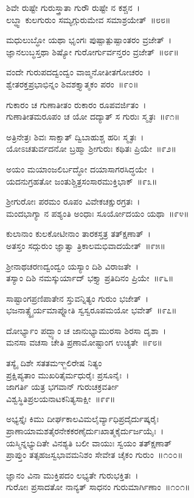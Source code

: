 ಶಿವೇ ರುಷ್ಟೇ ಗುರುಸ್ತ್ರಾತಾ ಗುರೌ ರುಷ್ಟೇ ನ ಕಶ್ಚನ~।\\
ಲಬ್ಧ್ವಾ ಕುಲಗುರುಂ ಸಮ್ಯಗ್ಗುರುಮೇವ ಸಮಾಶ್ರಯೇತ್~॥೮೮॥

ಮಧುಲುಬ್ಧೋ ಯಥಾ ಭೃಂಗಃ ಪುಷ್ಪಾತ್ಪುಷ್ಪಾಂತರಂ ವ್ರಜೇತ್~।\\
ಜ್ಞಾನಲುಬ್ಧಸ್ತಥಾ ಶಿಷ್ಯೋ ಗುರೋರ್ಗುರ್ವನ್ತರಂ ವ್ರಜೇತ್~॥೮೯॥

ವಂದೇ ಗುರುಪದದ್ವಂದ್ವಂ ವಾಙ್ಮನೋತೀತಗೋಚರಂ~।\\
ಶ್ವೇತರಕ್ತಪ್ರಭಾಭಿನ್ನಂ ಶಿವಶಕ್ತ್ಯಾತ್ಮಕಂ ಪರಂ~॥೯೦॥

ಗುಕಾರಂ ಚ ಗುಣಾತೀತಂ ರುಕಾರಂ ರೂಪವರ್ಜಿತಂ~।\\
ಗುಣಾತೀತಮರೂಪಂ ಚ ಯೋ ದದ್ಯಾತ್ ಸ ಗುರುಃ ಸ್ಮೃತಃ~॥೯೧॥

ಅತ್ರಿನೇತ್ರಃ ಶಿವಃ ಸಾಕ್ಷಾತ್ ದ್ವಿಬಾಹುಶ್ಚ ಹರಿಃ ಸ್ಮೃತಃ~।\\
ಯೋಽಚತುರ್ವದನೋ ಬ್ರಹ್ಮಾ ಶ್ರೀಗುರುಃ ಕಥಿತಃ ಪ್ರಿಯೇ~॥೯೨॥

ಅಯಂ ಮಯಾಂಜಲಿರ್ಬದ್ಧೋ ದಯಾಸಾಗರಸಿದ್ಧಯೇ~।\\
ಯದನುಗ್ರಹತೋ ಜಂತುಶ್ಚಿತ್ರಸಂಸಾರಮುಕ್ತಿಭಾಕ್~॥೯೩॥

ಶ್ರೀಗುರೋಃ ಪರಮಂ ರೂಪಂ ವಿವೇಕಚಕ್ಷುರಗ್ರತಃ~।\\
ಮಂದಭಾಗ್ಯಾ ನ ಪಶ್ಯಂತಿ ಅಂಧಾಃ ಸೂರ್ಯೋದಯಂ ಯಥಾ~॥೯೪॥

ಕುಲಾನಾಂ ಕುಲಕೋಟೀನಾಂ ತಾರಕಸ್ತತ್ರ ತತ್‌ಕ್ಷಣಾತ್~।\\
ಅತಸ್ತಂ ಸದ್ಗುರುಂ ಜ್ಞಾತ್ವಾ ತ್ರಿಕಾಲಮಭಿವಾದಯೇತ್~॥೯೫॥

ಶ್ರೀನಾಥಚರಣದ್ವಂದ್ವಂ ಯಸ್ಯಾಂ ದಿಶಿ ವಿರಾಜತೇ~।\\
ತಸ್ಯಾಂ ದಿಶಿ ನಮಸ್ಕುರ್ಯಾದ್ ಭಕ್ತ್ಯಾ ಪ್ರತಿದಿನಂ ಪ್ರಿಯೇ~॥೯೬॥

ಸಾಷ್ಟಾಂಗಪ್ರಣಿಪಾತೇನ ಸ್ತುವನ್ನಿತ್ಯಂ ಗುರುಂ ಭಜೇತ್~।\\
ಭಜನಾತ್ಸ್ಥೈರ್ಯಮಾಪ್ನೋತಿ ಸ್ವಸ್ವರೂಪಮಯೋ ಭವೇತ್~॥೯೭॥

ದೋರ್ಭ್ಯಾಂ ಪದ್ಭ್ಯಾಂ ಚ ಜಾನುಭ್ಯಾಮುರಸಾ ಶಿರಸಾ ದೃಶಾ~।\\
ಮನಸಾ ವಚಸಾ ಚೇತಿ ಪ್ರಣಾಮೋಷ್ಟಾಂಗ ಉಚ್ಯತೇ~॥೯೮॥

ತಸ್ಯೈ ದಿಶೇ ಸತತಮಞ್ಜಲಿರೇಷ ನಿತ್ಯಂ\\
ಪ್ರಕ್ಷಿಪ್ಯತಾಂ ಮುಖರಿತೈರ್ಮಧುರೈಃ ಪ್ರಸೂನೈಃ~।\\
ಜಾಗರ್ತಿ ಯತ್ರ ಭಗವಾನ್ ಗುರುಚಕ್ರವರ್ತೀ\\
ವಿಶ್ವಸ್ಥಿತಿಪ್ರಲಯನಾಟಕನಿತ್ಯಸಾಕ್ಷೀ~॥೯೯॥

ಅಭ್ಯಸ್ತೈಃ ಕಿಮು ದೀರ್ಘಕಾಲವಿಮಲೈರ್ವ್ಯಾಧಿಪ್ರದೈರ್ದುಷ್ಕರೈಃ\\
ಪ್ರಾಣಾಯಾಮಶತೈರನೇಕಕರಣೈರ್ದುಃಖಾತ್ಮಕೈರ್ದುರ್ಜಯೈಃ~।\\
ಯಸ್ಮಿನ್ನಭ್ಯುದಿತೇ ವಿನಶ್ಯತಿ ಬಲೀ ವಾಯುಃ ಸ್ವಯಂ ತತ್‌ಕ್ಷಣಾತ್\\
ಪ್ರಾಪ್ತುಂ ತತ್ಸಹಜಸ್ವಭಾವಮನಿಶಂ ಸೇವೇತ ಚೈಕಂ ಗುರುಂ~॥೧೦೦॥

ಜ್ಞಾನಂ ವಿನಾ ಮುಕ್ತಿಪದಂ ಲಭ್ಯತೇ ಗುರುಭಕ್ತಿತಃ~।\\
ಗುರೋಃ ಪ್ರಸಾದತೋ ನಾನ್ಯತ್ ಸಾಧನಂ ಗುರುಮಾರ್ಗಿಣಾಂ~॥೧೦೧॥

